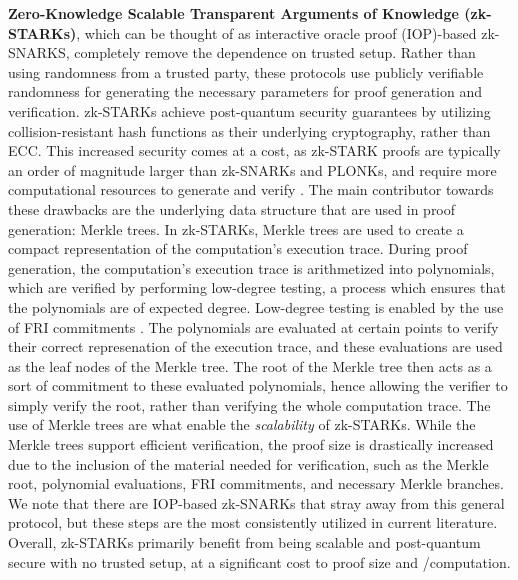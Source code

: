 \textbf{Zero-Knowledge Scalable Transparent Arguments of Knowledge (zk-STARKs)}, which can be thought of as interactive oracle proof (IOP)-based zk-SNARKS, completely remove the dependence on trusted setup. Rather than using randomness from a trusted party, these protocols use publicly verifiable randomness for generating the necessary parameters for proof generation and verification. zk-STARKs achieve post-quantum security guarantees by utilizing collision-resistant hash functions as their underlying cryptography, rather than ECC. This increased security comes at a cost, as zk-STARK proofs are typically an order of magnitude larger than zk-SNARKs and PLONKs, and require more computational resources to generate and verify \cite{ben2018scalable}. The main contributor towards these drawbacks are the underlying data structure that are used in proof generation: Merkle trees. In zk-STARKs, Merkle trees are used to create a compact representation of the computation's execution trace. During proof generation, the computation's execution trace is arithmetized into polynomials, which are verified by performing low-degree testing, a process which ensures that the polynomials are of expected degree. Low-degree testing is enabled by the use of FRI commitments \cite{habock2022summary}. The polynomials are evaluated at certain points to verify their correct represenation of the execution trace, and these evaluations are used as the leaf nodes of the Merkle tree. The root of the Merkle tree then acts as a sort of commitment to these evaluated polynomials, hence allowing the verifier to simply verify the root, rather than verifying the whole computation trace. \cite{ashur2018marvellous} The use of Merkle trees are what enable the \textit{scalability} of zk-STARKs. While the Merkle trees support efficient verification, the proof size is drastically increased due to the inclusion of the material needed for verification, such as the Merkle root, polynomial evaluations, FRI commitments, and necessary Merkle branches. We note that there are IOP-based zk-SNARKs that stray away from this general protocol, but these steps are the most consistently utilized in current literature. Overall, zk-STARKs primarily benefit from being scalable and post-quantum secure with no trusted setup, at a significant cost to proof size and \Prv/\Vrf computation.


